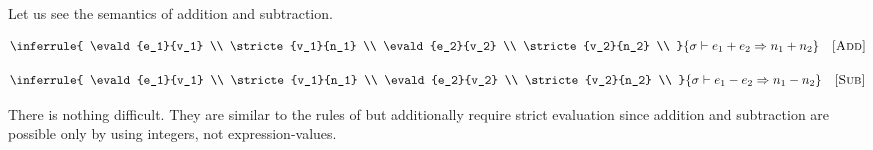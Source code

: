 Let us see the semantics of addition and subtraction.


\vspace{-1em}

\[
  \inferrule
  {
    \evald{e_1}{v_1} \\
    \stricte{v_1}{n_1} \\
    \evald{e_2}{v_2} \\
    \stricte{v_2}{n_2} \\
  }
  { \evald{\eadd{e_1}{e_2}}{n_1+n_2} }
  \quad\textsc{[Add]}
\]

\vspace{-1em}


\vspace{-1em}

\[
  \inferrule
  {
    \evald{e_1}{v_1} \\
    \stricte{v_1}{n_1} \\
    \evald{e_2}{v_2} \\
    \stricte{v_2}{n_2} \\
  }
  { \evald{\esub{e_1}{e_2}}{n_1-n_2} }
  \quad\textsc{[Sub]}
\]

There is nothing difficult. They are similar to the rules of \plang but
additionally require strict evaluation since addition and subtraction are
possible only by using integers, not expression-values.

